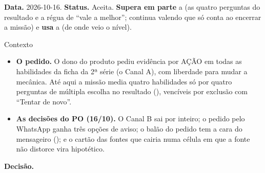 \textbf{Data.} 2026-10-16. \textbf{Status.} Aceita. \textbf{Supera em parte} a
 (as quatro perguntas do resultado e a régua de \enquote{vale a
melhor}; continua valendo que só conta ao encerrar a missão) e \textbf{usa} a
 (de onde veio o nível).

\begin{especificacao}{Contexto}
\begin{itemize}
  \item \textbf{O pedido.} O dono do produto pediu evidência por AÇÃO em todas
    as habilidades da ficha da 2ª série (o Canal A), com liberdade para mudar a
    mecânica. Até aqui a missão media quatro habilidades só por quatro
    perguntas de múltipla escolha no resultado (), vencíveis por
    exclusão com \enquote{Tentar de novo}.
  \item \textbf{As decisões do PO (16/10).} O Canal B sai por inteiro; o
    pedido pelo WhatsApp ganha três opções de aviso; o balão do pedido tem a
    cara do mensageiro (); e o cartão das fontes que cairia numa
    célula em que a fonte não distorce vira hipotético.
\end{itemize}
\end{especificacao}

\textbf{Decisão.}

